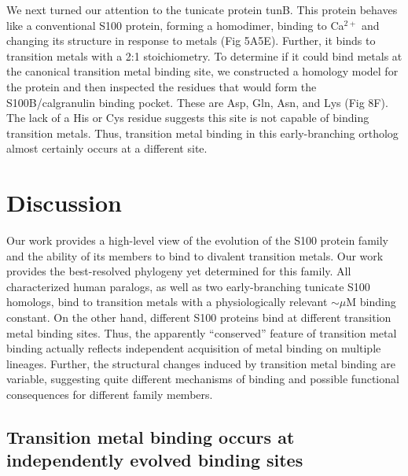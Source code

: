 We next turned our attention to the tunicate protein tunB. This protein
behaves like a conventional S100 protein, forming a homodimer, binding
to Ca$^{2+}$ and changing its structure in response to metals (Fig
5A\textendash 5E). Further, it binds to transition metals with a 2:1
stoichiometry. To determine if it could bind metals at the canonical
transition metal binding site, we constructed a homology model for
the protein and then inspected the residues that would form the S100B/calgranulin
binding pocket. These are Asp, Gln, Asn, and Lys (Fig 8F). The lack
of a His or Cys residue suggests this site is not capable of binding
transition metals. Thus, transition metal binding in this early-branching
ortholog almost certainly occurs at a different site.


\section{Discussion}

Our work provides a high-level view of the evolution of the S100 protein
family and the ability of its members to bind to divalent transition
metals. Our work provides the best-resolved phylogeny yet determined
for this family. All characterized human paralogs, as well as two
early-branching tunicate S100 homologs, bind to transition metals
with a physiologically relevant $\sim$$\mu$M binding constant. On
the other hand, different S100 proteins bind at different transition
metal binding sites. Thus, the apparently \textquotedblleft conserved\textquotedblright{}
feature of transition metal binding actually reflects independent
acquisition of metal binding on multiple lineages. Further, the structural
changes induced by transition metal binding are variable, suggesting
quite different mechanisms of binding and possible functional consequences
for different family members.


\subsection{Transition metal binding occurs at independently evolved binding sites}

